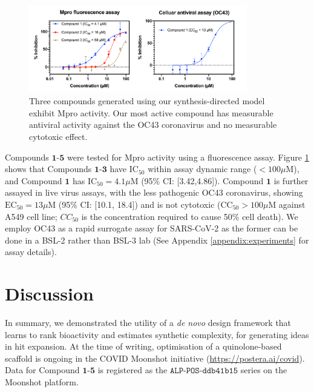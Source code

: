 \begin{figure}[!th]
    \centering
    \includegraphics[width=0.85\textwidth]{Chapters/Ranking/Figs/data_curve.pdf}
    \caption{Three compounds generated using our synthesis-directed model exhibit Mpro activity. Our most active compound has measurable antiviral activity against the OC43 coronavirus and no measurable cytotoxic effect.}
    \label{fig:data}
\end{figure}

Compounds $\mathbf{1}$-$\mathbf{5}$ were tested for Mpro activity using a fluorescence assay. Figure \ref{fig:data} shows that Compounds $\mathbf{1}$-$\mathbf{3}$ have $\mathrm{IC}_{50}$ within assay dynamic range ($<100 \mu$M), and Compound $\mathbf{1}$ has $\mathrm{IC}_{50} = 4.1 \mu$M (95\% CI: [3.42,4.86]). Compound $\mathbf{1}$ is further assayed in live virus assays, with the less pathogenic OC43 coronavirus, showing $\mathrm{EC}_{50} = 13 \mu$M (95\% CI: [10.1, 18.4]) and is not cytotoxic ($\mathrm{CC}_{50}>100 \mu$M against A549 cell line; $CC_{50}$ is the concentration required to cause 50\% cell death). We employ OC43 as a rapid surrogate assay for SARS-CoV-2 as the former can be done in a BSL-2 rather than BSL-3 lab (See Appendix \ref{appendix:experiments} for assay details). %

\section{Discussion} \label{sec:discussion}

In summary, we demonstrated the utility of a \emph{de novo} design framework that learns to rank bioactivity and estimates synthetic complexity, for generating ideas in hit expansion. At the time of writing, optimisation of a quinolone-based scaffold is ongoing in the COVID Moonshot initiative (\url{https://postera.ai/covid}). Data for Compound $\mathbf{1}$-$\mathbf{5}$ is registered as the $\texttt{ALP-POS-ddb41b15}$ series on the Moonshot platform. 

